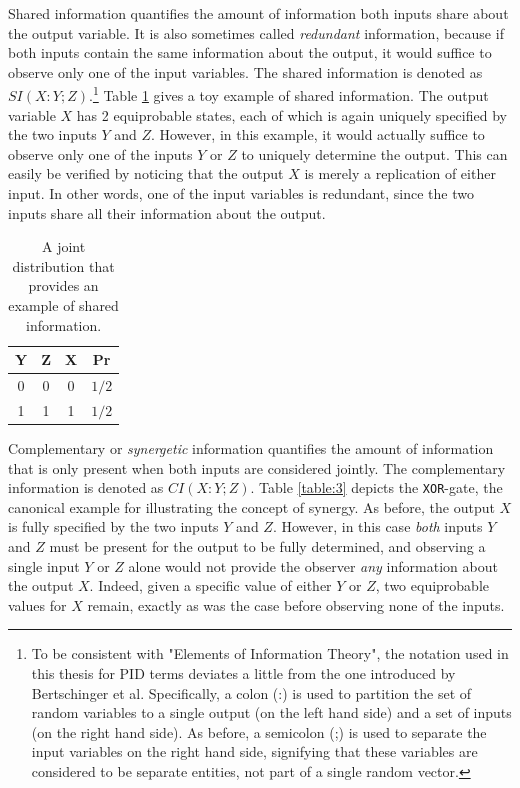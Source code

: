 \documentclass[12pt]{article}
\begin{document}
Shared information quantifies the amount of information both inputs share about the output variable. It is also sometimes called \textit{redundant} information, because if both inputs contain the same information about the output, it would suffice to observe only one of the input variables. The shared information is denoted as $SI(X:Y;Z)$.\footnote{To be consistent with "Elements of Information Theory", the notation used in this thesis for PID terms deviates a little from the one introduced by Bertschinger et al. \cite{bertschinger} Specifically, a colon (:) is used to partition the set of random variables to a single output (on the left hand side) and a set of inputs (on the right hand side). As before, a semicolon (;) is used to separate the input variables on the right hand side, signifying that these variables are considered to be separate entities, not part of a single random vector.} Table \ref{table:2} gives a toy example of shared information. The output variable $X$ has 2 equiprobable states, each of which is again uniquely specified by the two inputs $Y$ and $Z$. However, in this example, it would actually suffice to observe only one of the inputs $Y$ or $Z$ to uniquely determine the output. This can easily be verified by noticing that the output $X$ is merely a replication of either input. In other words, one of the input variables is redundant, since the two inputs share all their information about the output.

\begin{table}[h!]
\centering
\caption{A joint distribution that provides an example of shared information.}
\begin{tabular}{|c c |c|c|}
	\hline
	Y & Z & X & Pr\\ 
	\hline
	0 & 0 & 0 & $1/2$\\
	1 & 1 & 1 & $1/2$\\ 
	\hline
\end{tabular}
\label{table:2}
\end{table}

Complementary or \textit{synergetic} information quantifies the amount of information that is only present when both inputs are considered jointly. The complementary information is denoted as $CI(X:Y;Z)$. Table \ref{table:3} depicts the \texttt{XOR}-gate, the canonical example for illustrating the concept of synergy. As before, the output $X$ is fully specified by the two inputs $Y$ and $Z$. However, in this case \textit{both} inputs $Y$ and $Z$ must be present for the output to be fully determined, and observing a single input $Y$ or $Z$ alone would not provide the observer \textit{any} information about the output $X$. Indeed, given a specific value of either $Y$ or $Z$, two equiprobable values for $X$ remain, exactly as was the case before observing none of the inputs. 
\end{document}
